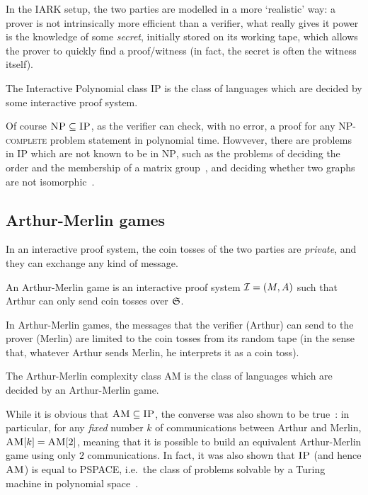 In the IARK setup, the two parties are modelled in a more `realistic' way: 
a prover is not intrinsically more efficient than a verifier, what really gives it power is the 
knowledge of some \emph{secret}, initially stored on its working tape, which 
allows the prover to quickly find a proof/witness (in fact, the secret is often the witness itself).
\begin{definition}
  The Interactive Polynomial class \textsc{IP} is the class of languages which are decided by some
  interactive proof system.
\end{definition}

Of course \(\textsc{NP} \subseteq \textsc{IP}\), as the verifier can check, with no error, a 
proof for any \textsc{NP-complete} problem statement in polynomial time.
Howvever, there are problems in \textsc{IP} which are not known to be in \textsc{NP}, such as 
the problems of deciding the order and the membership of a matrix group~\cite{BabaiS1984}, and 
deciding whether two graphs are not isomorphic~\cite{GoldreichMW1991}.

\subsection{Arthur-Merlin games}
In an interactive proof system, the coin tosses of the two parties are \emph{private}, and 
they can exchange any kind of message.
\begin{definition}
  An Arthur-Merlin game is an interactive proof system \(\mathcal{I} = \left(M, A\right)\) such that
  Arthur can only send coin tosses over \(\mathfrak{\mathfrak{S}}\).
\end{definition}

In Arthur-Merlin games, the messages that the verifier (Arthur) can send to the prover (Merlin) are 
limited to the coin tosses from its random tape (in the sense that, whatever Arthur sends Merlin, 
he interprets it as a coin toss).

\begin{definition}
  The Arthur-Merlin complexity class \textsc{AM} is the class of languages which are decided by an
  Arthur-Merlin game.
\end{definition}

While it is obvious that \(\textsc{AM} \subseteq \textsc{IP}\), the converse was also shown to 
be true~\cite{BabaiS1984}: in particular, for any \emph{fixed} number \(k\) of communications 
between Arthur and Merlin, \(\extend{\textsc{AM}}{k} = \extend{\textsc{AM}}{2}\), meaning that 
it is possible to build an equivalent Arthur-Merlin game using only \(2\) communications.
In fact, it was also shown that \(\textsc{IP}\) (and hence \(\textsc{AM}\)) is equal to 
\textsc{PSPACE}, i.e.\ the class of problems solvable by a Turing machine in polynomial 
space~\cite{Shamir1992}.
